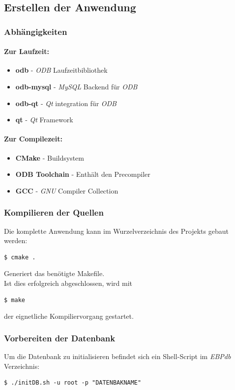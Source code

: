 \newpage

\subsection{Erstellen der Anwendung}
\subsubsection{Abhängigkeiten}
\paragraph{Zur Laufzeit:}
\begin{itemize}
	\item \textbf{odb} - \textit{ODB} Laufzeitbibliothek
	\item \textbf{odb-mysql} - \textit{MySQL} Backend für \textit{ODB}
	\item \textbf{odb-qt} - \textit{Qt} integration für \textit{ODB}
	\item \textbf{qt} - \textit{Qt} Framework
\end{itemize}
\paragraph{Zur Compilezeit:}
\begin{itemize}
	\item \textbf{CMake} - Buildsystem
	\item \textbf{ODB Toolchain} - Enthält den Precompiler
	\item \textbf{GCC} - \textit{GNU} Compiler Collection
\end{itemize}
\subsubsection{Kompilieren der Quellen}
Die komplette Anwendung kann im Wurzelverzeichnis des Projekts gebaut werden:\\
\begin{lstlisting}
$ cmake .
\end{lstlisting}
Generiert das benötigte Makefile.\\
Ist dies erfolgreich abgeschlossen, wird mit\\
\begin{lstlisting}
$ make
\end{lstlisting}
der eignetliche Kompiliervorgang gestartet.\\
\subsubsection{Vorbereiten der Datenbank}
Um die Datenbank zu initialisieren befindet sich ein Shell-Script im \textit{EBPdb} Verzeichnis:\\
\begin{lstlisting}
$ ./initDB.sh -u root -p "DATENBAKNAME"
\end{lstlisting}
